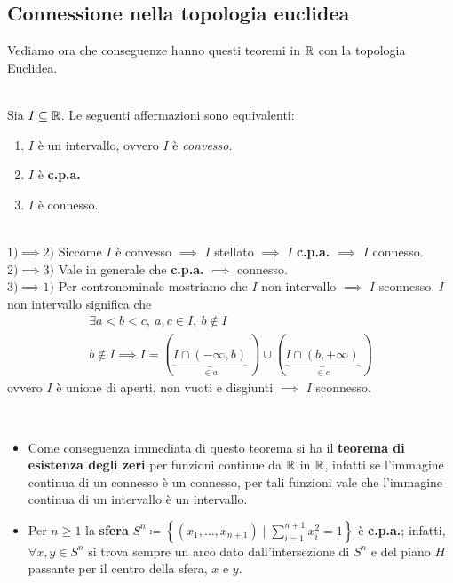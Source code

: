 \subsection{Connessione nella topologia euclidea}
Vediamo ora che conseguenze hanno questi teoremi in $\mathbb{R}$ con la topologia Euclidea.
\begin{theorema}~{}\\
	Sia $I\subseteq \mathbb{R}$. Le seguenti affermazioni sono equivalenti:
		\begin{enumerate}
	\item $I$ è un intervallo, ovvero $I$ è \textit{convesso}.
	\item $I$ è \textbf{c.p.a.}
	\item $I$ è connesso.
		\end{enumerate}
	\vspace{-3mm}
\end{theorema}
\begin{demonstration}~{}\\
	$1) \implies 2)$ Siccome $I$ è convesso $\implies$ $I$ stellato $\implies$ $I$ \textbf{c.p.a.} $\implies$ $I$ connesso. \\
	$2) \implies 3)$ Vale in generale che \textbf{c.p.a.} $\implies$ connesso.\\
	$3) \implies 1)$ Per contronominale mostriamo che $I$ non intervallo $\implies$ $I$ sconnesso. $I$ non intervallo significa che
		\begin{gather*}
			\exists a<b<c,\ a,c\in I,\ b\notin I \\
			b\notin I \implies I= \left(\underbrace{ I\cap \left(-\infty ,b\right)}_{\in a}\ \right) \cup \left( \underbrace{I\cap \left(b ,+\infty\right)}_{\in c}\ \right)
		\end{gather*}
	ovvero $I$ è unione di aperti, non vuoti e disgiunti $\implies$ $I$ sconnesso.	
\end{demonstration}
\begin{observe}~{}\label{teorema esistenza zeri funzioni continue, s^n cpa}
		\begin{itemize}
	\item Come conseguenza immediata di questo teorema si ha il \textbf{teorema di esistenza degli zeri} per funzioni continue da $\mathbb{R}$ in $\mathbb{R}$, infatti se l'immagine continua di un connesso è un connesso, per tali funzioni vale che l'immagine continua di un intervallo è un intervallo.
	\item Per $n\geq 1$ la \textbf{sfera} $\displaystyle S^n \coloneqq \left\{ \left(x_1,\dots,x_{n+1}\right) \mid \sum_{i=1}^{n+1}x_i^2=1 \right\}$ è \textbf{c.p.a.}; infatti, $\forall x,y\in S^n$ si trova sempre un arco dato dall'intersezione di $S^n$ e del piano $H$ passante per il centro della sfera, $x$ e $y$.
		\end{itemize}
	\vspace{-3mm}
\end{observe}
